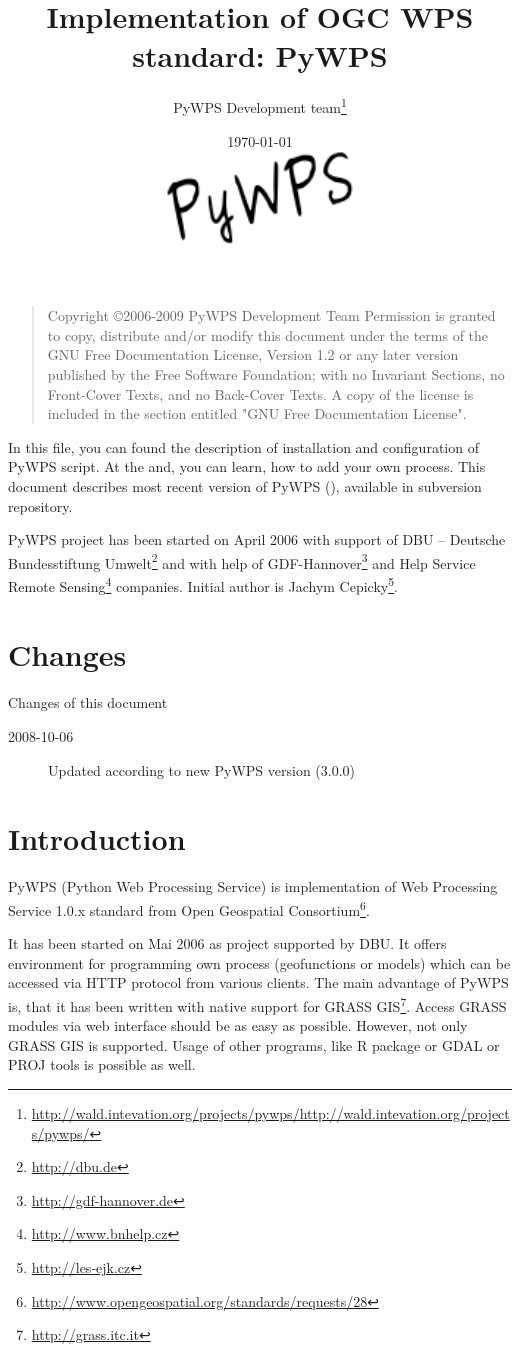 \documentclass[a4paper,11pt]{report}
\author{PyWPS Development team\thanks{\url{http://wald.intevation.org/projects/pywps/http://wald.intevation.org/projects/pywps/}}}
\title{Implementation of OGC WPS standard: PyWPS}
\date{\today\\{}\vspace{2cm}\includegraphics[width=5cm]{pic/pywps.png}}
\begin{document}
\maketitle{}

\bigskip
\begin{quote}
    Copyright \copyright  2006-2009 PyWPS Development Team
    Permission is granted to copy, distribute and/or modify this document
    under the terms of the GNU Free Documentation License, Version 1.2
    or any later version published by the Free Software Foundation;
    with no Invariant Sections, no Front-Cover Texts, and no Back-Cover Texts.
    A copy of the license is included in the section entitled "GNU
    Free Documentation License".
\end{quote}
\bigskip


In this file, you can found the description of installation and
configuration of PyWPS script. At the and, you can learn, how to add
your own process. This document describes most recent
version of PyWPS (\version), available in subversion repository.

PyWPS project has been started on April 2006 with support of DBU --
Deutsche Bundesstiftung Umwelt\footnote{\url{http://dbu.de}} and with help of
GDF-Hannover\footnote{\url{http://gdf-hannover.de}} and Help Service Remote
Sensing\footnote{\url{http://www.bnhelp.cz}} companies. Initial author is Jachym
Cepicky\footnote{\url{http://les-ejk.cz}}.
    
\chapter{Changes}
Changes of this document
\begin{description}
    \item [2008-10-06] Updated according to new PyWPS version (3.0.0) \jachym
\end{description}

\tableofcontents

\newpage

\chapter{Introduction}
PyWPS (Python Web Processing Service) is implementation of Web
Processing Service 1.0.x standard from Open Geospatial
Consortium\footnote{\url{http://www.opengeospatial.org/standards/requests/28}}.

It has been started on Mai 2006 as project supported by DBU. It offers
environment for programming own process (geofunctions or models) which can
be accessed via HTTP protocol from various clients. The main advantage of PyWPS is, that it has
been written with native support for GRASS
GIS\footnote{\url{http://grass.itc.it}}. Access GRASS modules via web
interface should be as easy as possible.
However, not only GRASS GIS is supported. Usage of other programs, like
R package or GDAL or PROJ tools is possible as well.
\end{document}
